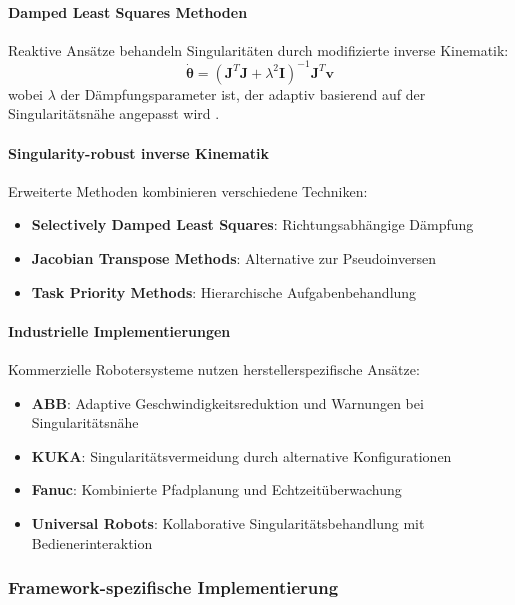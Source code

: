 \paragraph{Damped Least Squares Methoden}
Reaktive Ansätze behandeln Singularitäten durch modifizierte inverse Kinematik:
\begin{equation}
    \dot{\boldsymbol{\theta}} = (\mathbf{J}^T\mathbf{J} + \lambda^2\mathbf{I})^{-1}\mathbf{J}^T\mathbf{v}
    \label{eq:damped_least_squares}
\end{equation}
wobei $\lambda$ der Dämpfungsparameter ist, der adaptiv basierend auf der Singularitätsnähe angepasst wird \cite{nakamura1986inverse}.

\paragraph{Singularity-robust inverse Kinematik}
Erweiterte Methoden kombinieren verschiedene Techniken:

\begin{itemize}
    \item \textbf{Selectively Damped Least Squares}: Richtungsabhängige Dämpfung \cite{buss2004selectively}
    \item \textbf{Jacobian Transpose Methods}: Alternative zur Pseudoinversen \cite{wolovich1984computational}
    \item \textbf{Task Priority Methods}: Hierarchische Aufgabenbehandlung \cite{siciliano1991general}
\end{itemize}

\paragraph{Industrielle Implementierungen}
Kommerzielle Robotersysteme nutzen herstellerspezifische Ansätze:

\begin{itemize}
    \item \textbf{ABB}: Adaptive Geschwindigkeitsreduktion und Warnungen bei Singularitätsnähe
    \item \textbf{KUKA}: Singularitätsvermeidung durch alternative Konfigurationen
    \item \textbf{Fanuc}: Kombinierte Pfadplanung und Echtzeitüberwachung
    \item \textbf{Universal Robots}: Kollaborative Singularitätsbehandlung mit Bedienerinteraktion
\end{itemize}

\subsubsection{Framework-spezifische Implementierung}
\label{sssec:Framework_Implementierung}

